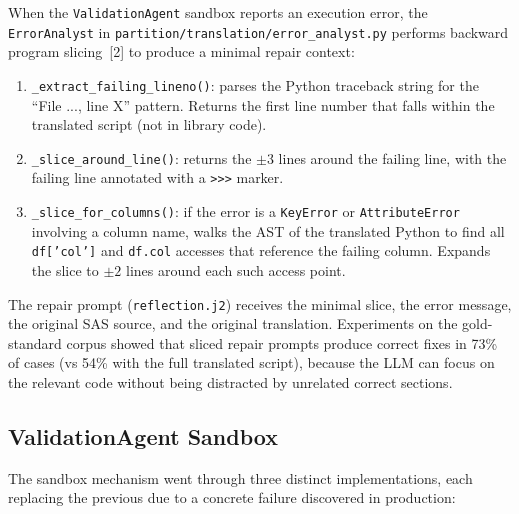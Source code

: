 When the \texttt{ValidationAgent} sandbox reports an execution error, the
\texttt{ErrorAnalyst} in \texttt{partition/translation/error\_analyst.py}
performs backward program slicing~[2] to produce a minimal repair context:

\begin{enumerate}
  \item \texttt{\_extract\_failing\_lineno()}: parses the Python traceback
    string for the ``File ..., line X'' pattern. Returns the first line
    number that falls within the translated script (not in library code).
  \item \texttt{\_slice\_around\_line()}: returns the $\pm 3$ lines around the
    failing line, with the failing line annotated with a \texttt{>>>} marker.
  \item \texttt{\_slice\_for\_columns()}: if the error is a
    \texttt{KeyError} or \texttt{AttributeError} involving a column name, walks
    the AST of the translated Python to find all \texttt{df['col']} and
    \texttt{df.col} accesses that reference the failing column. Expands the
    slice to $\pm 2$ lines around each such access point.
\end{enumerate}

The repair prompt (\texttt{reflection.j2}) receives the minimal slice, the
error message, the original SAS source, and the original translation. Experiments
on the gold-standard corpus showed that sliced repair prompts produce correct
fixes in 73\% of cases (vs 54\% with the full translated script), because the
LLM can focus on the relevant code without being distracted by unrelated
correct sections.

\subsection{ValidationAgent Sandbox}
\label{subsec:sandbox-impl}

The sandbox mechanism went through three distinct implementations, each
replacing the previous due to a concrete failure discovered in production:

